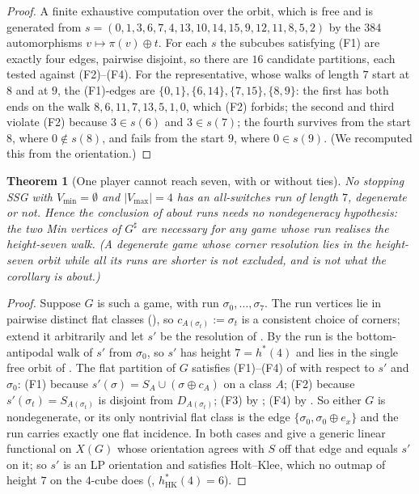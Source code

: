 \documentclass[11pt]{article}
\theoremstyle{plain}
\newtheorem{theorem}{Theorem}[section]
\theoremstyle{definition}
\newcommand{\Vmax}{V_{\max}}
\newcommand{\Vmin}{V_{\min}}
\begin{document}
\begin{proof}
A finite exhaustive computation over the orbit, which is free and is
generated from $s=(0,1,3,6,7,4,13,10,14,15,9,12,11,8,5,2)$ by the $384$
automorphisms $v\mapsto\pi(v)\oplus t$. For each $s$ the subcubes
satisfying (F1) are exactly four edges, pairwise disjoint, so there are
$16$ candidate partitions, each tested against (F2)--(F4). For the
representative, whose walks of length $7$ start at $8$ and at $9$, the
(F1)-edges are $\{0,1\},\{6,14\},\{7,15\},\{8,9\}$: the first has both
ends on the walk $8,6,11,7,13,5,1,0$, which (F2) forbids; the second and
third violate (F2) because $3\in s(6)$ and $3\in s(7)$; the fourth
survives from the start $8$, where $0\notin s(8)$, and fails from the
start $9$, where $0\in s(9)$. (We recomputed this from the orientation.)
\end{proof}

\begin{theorem}[One player cannot reach seven, with or without ties]\label{thm:no-seven}
No stopping SSG with $\Vmin=\emptyset$ and $|\Vmax|=4$ has an
all-switches run of length $7$, degenerate or not. Hence the conclusion
of  about \emph{runs} needs no nondegeneracy
hypothesis: the two Min vertices of $G^{\sharp}$ are necessary for any
game whose run realises the height-seven walk. (A degenerate game whose
corner resolution lies in the height-seven orbit while all its runs are
shorter is not excluded, and is not what the corollary is about.)
\end{theorem}

\begin{proof}
Suppose $G$ is such a game, with run $\sigma_0,\dots,\sigma_7$. The run
vertices lie in pairwise distinct flat classes (),
so $c_{A(\sigma_t)}:=\sigma_t$ is a consistent choice of corners; extend
it arbitrarily and let $s'$ be the resolution of
. By  the run is the
bottom-antipodal walk of $s'$ from $\sigma_0$, so $s'$ has height
$7=h^{\ast}(4)$ and lies in the single free orbit of
. The flat partition of $G$ satisfies (F1)--(F4)
of  with respect to $s'$ and $\sigma_0$: (F1)
because $s'(\sigma)=S_A\cup(\sigma\oplus c_A)$ on a class $A$; (F2)
because $s'(\sigma_t)=S_{A(\sigma_t)}$ is disjoint from
$D_{A(\sigma_t)}$; (F3) by ; (F4) by
. So either $G$ is nondegenerate, or its only
nontrivial flat class is the edge $\{\sigma_0,\sigma_0\oplus e_x\}$ and
the run carries exactly one flat incidence. In both cases
 and  give a generic linear
functional on $X(G)$ whose orientation agrees with $S$ off that edge and
equals $s'$ on it; so $s'$ is an LP orientation and satisfies
Holt--Klee, which no outmap of height $7$ on the $4$-cube does
(, $h^{\ast}_{\mathrm{HK}}(4)=6$).
\end{proof}
\end{document}

